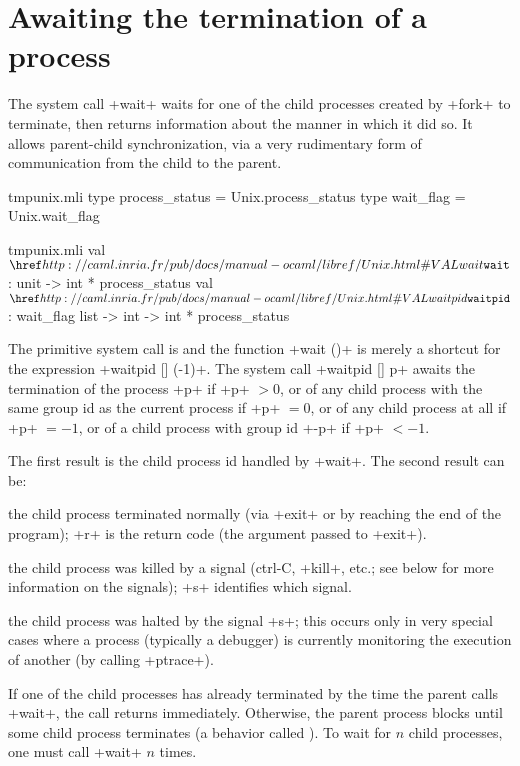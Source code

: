 \section{Awaiting the termination of a process} \label{double-fork}

The system call \ml+wait+ waits for one of the child processes created
by \ml+fork+ to terminate, then returns information about the manner
in which it did so.  It allows parent-child synchronization, via a
very rudimentary form of communication from the child to the parent.
\label{wait}
%
\begin{codefile}{tmpunix.mli}
type process_status = Unix.process_status
type wait_flag = Unix.wait_flag
\end{codefile}
%
\begin{listingcodefile}{tmpunix.mli}
val $\indexlibvalue{Unix}{wait}$ : unit -> int * process_status
val $\libvalue{Unix}{waitpid}$ : wait_flag list -> int -> int * process_status
\end{listingcodefile}
%
The primitive system call is  and the function
\ml+wait ()+ is merely a shortcut for the expression \ml+waitpid [] (-1)+.
%
The system call \ml+waitpid [] p+ awaits the termination of the
process \ml+p+ if \ml+p+ $> 0$, or of any child process with the same
group id as the current process if \ml+p+ $= 0$, or of any child
process at all if \ml+p+ $= -1$, or of a child process with group id
\ml+-p+ if \ml+p+ $<-1$.

The first result is the child process id handled by \ml+wait+. The
second result can be:
%
\begin{mltypecases}
 the child process terminated normally (via
\ml+exit+ or by reaching the end of the program); \ml+r+ is the return
code (the argument passed to \ml+exit+).

 the child process was killed by a signal
(ctrl-C, \ml+kill+, etc.; see below for more information on the
signals); \ml+s+ identifies which signal.

 the child process was halted by the signal
\ml+s+; this occurs only in very special cases where a process
(typically a debugger) is currently monitoring the execution of
another (by calling \ml+ptrace+).
\end{mltypecases}
%
If one of the child processes has already terminated by the time the
parent calls \ml+wait+, the call returns immediately.  Otherwise, the
parent process blocks until some child process terminates (a behavior
called ). To wait for $n$ child processes, one must
call \ml+wait+ $n$ times.

